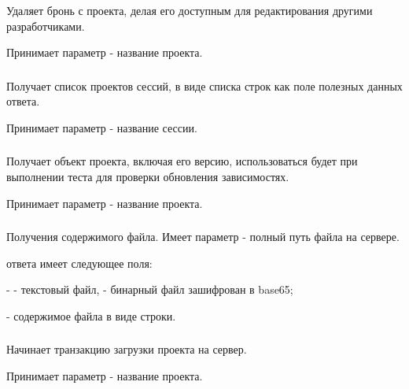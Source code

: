 Удаляет бронь с проекта, делая его доступным для редактирования другими разработчиками.

Принимает параметр  - название проекта.

\subsubsection{}

Получает список проектов сессий, в виде списка строк как поле  полезных данных ответа.

Принимает параметр  - название сессии.

\subsubsection{}

Получает объект проекта, включая его версию, использоваться будет при выполнении теста для проверки обновления зависимостях.

Принимает параметр  - название проекта.

\subsubsection{}

Получения содержимого файла. Имеет параметр  - полный путь файла на сервере.
 
 ответа имеет следующее поля:

\begin{icItems}
	\item {} -  - текстовый файл,  - бинарный файл зашифрован в base65;
	\item {} - содержимое файла в виде строки.
\end{icItems}

\subsubsection{}

Начинает транзакцию загрузки проекта на сервер.

Принимает параметр  - название проекта.

\subsubsection{}

